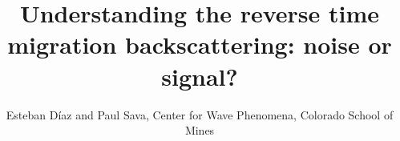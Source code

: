 

\setlength{\parskip}{2.5pt}
\setlength{\textfloatsep}{7pt}
\setlength{\abovecaptionskip}{2.5pt}

\renewcommand\floatpagefraction{.9}
\renewcommand\topfraction{.9}
\renewcommand\bottomfraction{.9}
\renewcommand\textfraction{.1}
\setcounter{totalnumber}{50}
\setcounter{topnumber}{50}
\setcounter{bottomnumber}{50}

\author{Esteban D\'{i}az and Paul Sava, 
Center for Wave Phenomena,  
Colorado School of Mines}

\title{Understanding the reverse time migration backscattering: noise or signal?}

\maketitle









